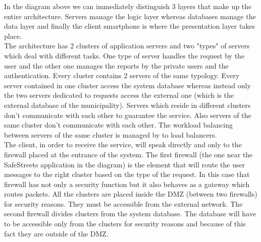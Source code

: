 \documentclass[titlepage]{article}
\begin{document}
\FloatBarrier
In the diagram above we can immediately distinguish 3 layers that make up the entire architecture. Servers manage the logic layer whereas databases manage the data layer and finally the client smartphone is where the presentation layer takes place. \\
The architecture has 2 clusters of application servers and two "types" of servers which deal with different tasks. One type of server handles the request by the user and the other one manages the reports by the private users and the authentication. Every cluster contains 2 servers of the same typology. Every server contained in one cluster access the system database whereas instead only the two servers dedicated to requests access the external one (which is the external database of the municipality). Servers which reside in different clusters don't communicate with each other to guarantee the service. Also servers of the same cluster don't communicate with each other. The workload balancing between servers of the same cluster is managed by to load balancers.\\
The client, in order to receive the service, will speak directly and only to the firewall placed at the entrance of the system. The first firewall (the one near the SafeStreets application in the diagram) is the element that will route the user messages to the right cluster based on the type of the request. In this case that firewall has not only a security function but it also behaves as a gateway which routes packets. All the clusters are placed inside the DMZ (between two firewalls) for security reasons. They must be accessible from the external network. The second firewall divides clusters from the system database. The database will have to be accessible only from the clusters for security reasons and because of this fact they are outside of the DMZ. \\
\end{document}
